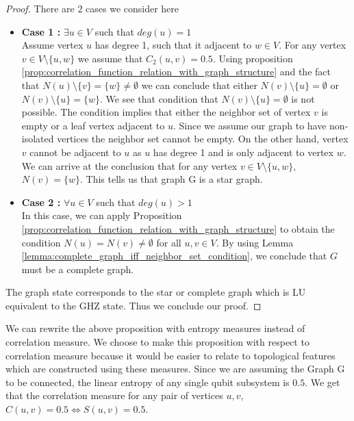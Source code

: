 \documentclass{article}
\begin{document}
\begin{proof}
There are 2 cases we consider here 
\begin{itemize}
    \item \textbf{Case 1 :} $\exists u \in V$ such that $deg(u) = 1$ \\
    Assume vertex $ u $ has degree 1, such that it adjacent to $ w \in V $. For any vertex $v \in V\setminus\{u,w\}$ we assume that $C_2(u, v) = 0.5$. Using proposition \ref{prop:correlation_function_relation_with_graph_structure} and the fact that $N(u) \setminus \{v\} =\{w\} \neq \emptyset$ we can conclude that either $N(v) \setminus\{u\} = \emptyset$ or $N(v) \setminus\{u\} = \{w\}$. We see that condition that $N(v) \setminus\{u\} = \emptyset$ is not possible. The condition implies that either the neighbor set of vertex $v$ is empty or a leaf vertex adjacent to $u$. Since we assume our graph to have non-isolated vertices the neighbor set cannot be empty. On the other hand, vertex $v$ cannot be adjacent to $u$ as $u$ has degree 1 and is only adjacent to vertex $w$. We can arrive at the conclusion that for any vertex $v \in V\setminus\{u,w\}$, $N(v) = \{w\} $. This tells us that graph G is a star graph.
     \item \textbf{Case 2 :} $\forall u \in V$ such that $deg(u) > 1$ \\
In this case, we can apply Proposition \ref{prop:correlation_function_relation_with_graph_structure} to obtain the condition $ N(u) = N(v) \neq \emptyset $ for all $ u, v \in V $. By using Lemma \ref{lemma:complete_graph_iff_neighbor_set_condition}, we conclude that $ G $ must be a complete graph.
\end{itemize}
The graph state corresponds to the star or complete graph which is LU equivalent to the GHZ state. Thus we conclude our proof.
\end{proof}

We can rewrite the above proposition with entropy measures instead of correlation measure. We choose to make this proposition with respect to correlation measure because it would be easier to relate to topological features which are constructed using these measures. Since we are assuming the Graph G to be connected, the linear entropy of any single qubit subsystem is $0.5$. We get that the correlation measure for any pair of vertices $u, v$, $C(u, v) = 0.5 \iff S(u, v) = 0.5$. 
\end{document}
